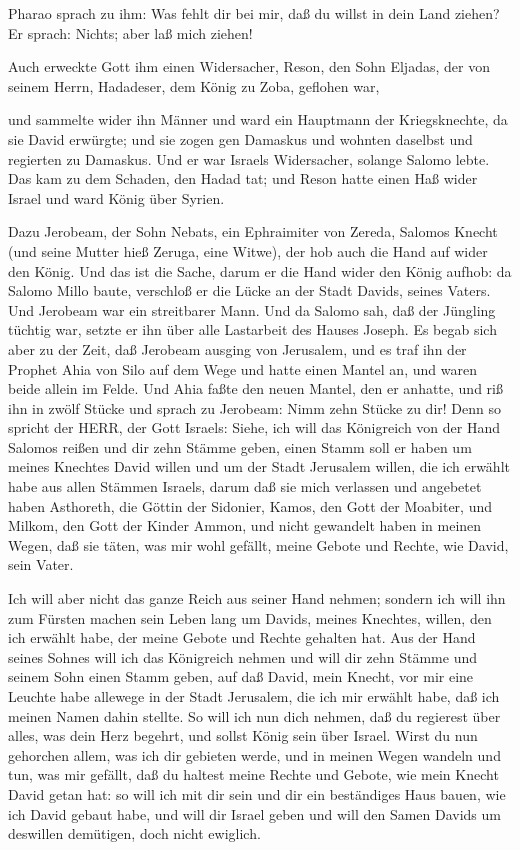  Pharao sprach zu ihm: Was fehlt dir bei mir, daß du willst
in dein Land ziehen? Er sprach: Nichts; aber laß mich ziehen!

 Auch erweckte Gott ihm einen Widersacher, Reson, den Sohn
Eljadas, der von seinem Herrn, Hadadeser, dem König zu Zoba, geflohen
war,

 und sammelte wider ihn Männer und ward ein Hauptmann der
Kriegsknechte, da sie David erwürgte; und sie zogen gen Damaskus und
wohnten daselbst und regierten zu Damaskus.  Und er war
Israels Widersacher, solange Salomo lebte. Das kam zu dem Schaden, den
Hadad tat; und Reson hatte einen Haß wider Israel und ward König über
Syrien.

 Dazu Jerobeam, der Sohn Nebats, ein Ephraimiter von
Zereda, Salomos Knecht (und seine Mutter hieß Zeruga, eine Witwe), der
hob auch die Hand auf wider den König.  Und das ist die
Sache, darum er die Hand wider den König aufhob: da Salomo Millo baute,
verschloß er die Lücke an der Stadt Davids, seines Vaters. 
Und Jerobeam war ein streitbarer Mann. Und da Salomo sah, daß der
Jüngling tüchtig war, setzte er ihn über alle Lastarbeit des Hauses
Joseph.  Es begab sich aber zu der Zeit, daß Jerobeam
ausging von Jerusalem, und es traf ihn der Prophet Ahia von Silo auf dem
Wege und hatte einen Mantel an, und waren beide allein im Felde.
 Und Ahia faßte den neuen Mantel, den er anhatte, und riß
ihn in zwölf Stücke  und sprach zu Jerobeam: Nimm zehn
Stücke zu dir! Denn so spricht der HERR, der Gott Israels: Siehe, ich
will das Königreich von der Hand Salomos reißen und dir zehn Stämme
geben,  einen Stamm soll er haben um meines Knechtes David
willen und um der Stadt Jerusalem willen, die ich erwählt habe aus allen
Stämmen Israels,  darum daß sie mich verlassen und
angebetet haben Asthoreth, die Göttin der Sidonier, Kamos, den Gott der
Moabiter, und Milkom, den Gott der Kinder Ammon, und nicht gewandelt
haben in meinen Wegen, daß sie täten, was mir wohl gefällt, meine Gebote
und Rechte, wie David, sein Vater.

 Ich will aber nicht das ganze Reich aus seiner Hand
nehmen; sondern ich will ihn zum Fürsten machen sein Leben lang um
Davids, meines Knechtes, willen, den ich erwählt habe, der meine Gebote
und Rechte gehalten hat.  Aus der Hand seines Sohnes will
ich das Königreich nehmen und will dir zehn Stämme  und
seinem Sohn einen Stamm geben, auf daß David, mein Knecht, vor mir eine
Leuchte habe allewege in der Stadt Jerusalem, die ich mir erwählt habe,
daß ich meinen Namen dahin stellte.  So will ich nun dich
nehmen, daß du regierest über alles, was dein Herz begehrt, und sollst
König sein über Israel.  Wirst du nun gehorchen allem, was
ich dir gebieten werde, und in meinen Wegen wandeln und tun, was mir
gefällt, daß du haltest meine Rechte und Gebote, wie mein Knecht David
getan hat: so will ich mit dir sein und dir ein beständiges Haus bauen,
wie ich David gebaut habe, und will dir Israel geben  und
will den Samen Davids um deswillen demütigen, doch nicht ewiglich.

